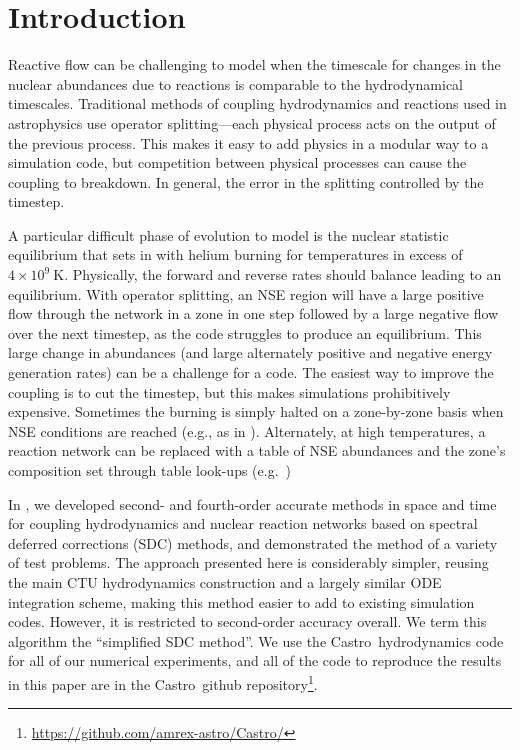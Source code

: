 \documentclass[times,modern]{aastex63}
\newcommand{\castro}{{\sf Castro}}
\newcommand{\MarginPar}[1]{\marginpar{\vskip-\baselineskip\raggedright\tiny\sffamily\hrule\smallskip{\color{red}#1}\par\smallskip\hrule}}
\begin{document}

\section{Introduction}\label{Sec:Introduction}

Reactive flow can be challenging to model when the timescale for
changes in the nuclear abundances due to reactions is comparable to
the hydrodynamical timescales.  Traditional methods of coupling
hydrodynamics and reactions used in astrophysics use operator
splitting---each physical process acts on the output of the previous
process.  This makes it easy to add physics in a modular way to a
simulation code, but competition between physical processes can cause
the coupling to breakdown.  In general, the error in the splitting
controlled by the timestep.

A particular difficult phase of evolution to model is the nuclear
statistic equilibrium that sets in with helium burning for
temperatures in excess of $4\times 10^9~\mathrm{K}$.  Physically, the
forward and reverse rates should balance leading to an equilibrium.
With operator splitting, an NSE region will have a large positive flow
through the network in a zone in one step followed by a large negative
flow over the next timestep, as the code struggles to produce an
equilibrium.  This large change in abundances (and large alternately
positive and negative energy generation rates) can be a challenge for
a code.  The easiest way to improve the coupling is to cut the
timestep, but this makes simulations prohibitively expensive.
Sometimes the burning is simply halted on a zone-by-zone basis when
NSE conditions are reached (e.g., as in \citealt{hedet}).
Alternately, at high temperatures, a reaction network can be replaced
with a table of NSE abundances and the zone's composition set through
table look-ups (e.g.\ \citealt{ma:2013}) \MarginPar{need more here}

In \cite{castro_sdc}, we developed second- and fourth-order accurate
methods in space and time for coupling hydrodynamics and nuclear
reaction networks based on spectral deferred corrections (SDC)
methods, and demonstrated the method of a variety of test problems.
The approach presented here is considerably simpler, reusing the main
CTU hydrodynamics construction and a largely similar ODE integration
scheme, making this method easier to add to existing simulation codes.
However, it is restricted to second-order accuracy overall.  We term
this algorithm the ``simplified SDC method''.  We use the
\castro\ hydrodynamics code \cite{castro} for all of our numerical
experiments, and all of the code to reproduce the results in this
paper are in the \castro\ github
repository\footnote{\url{https://github.com/amrex-astro/Castro/}}.
\end{document}
